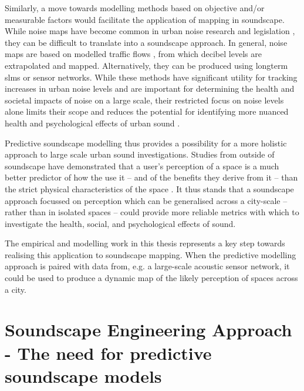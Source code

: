 Similarly, a move towards modelling methods based on objective and/or measurable factors would facilitate the application of mapping in soundscape. While noise maps have become common in urban noise research and legislation \citep{EEA2020Environment} , they can be difficult to translate into a soundscape approach. In general, noise maps are based on modelled traffic flows \cit{}, from which decibel levels are extrapolated and mapped. Alternatively, they can be produced using longterm \glspl{slm} or sensor networks. While these methods have significant utility for tracking increases in urban noise levels and are important for determining the health and societal impacts of noise on a large scale, their restricted focus on noise levels alone limits their scope and reduces the potential for identifying more nuanced health and psychological effects of urban sound .

Predictive soundscape modelling thus provides a possibility for a more holistic approach to large scale urban sound investigations. Studies from outside of soundscape have demonstrated that a user's perception of a space is a much better predictor of how the use it -- and of the benefits they derive from it -- than the strict physical characteristics of the space \citep{Kruize2019Exploring}. It thus stands that a soundscape approach focussed on perception which can be generalised across a city-scale -- rather than in isolated spaces -- could provide more reliable metrics with which to investigate the health, social, and psychological effects of sound.

The empirical and modelling work in this thesis represents a key step towards realising this application to soundscape mapping. When the predictive modelling approach is paired with data from, e.g. a large-scale acoustic sensor network, it could be used to produce a dynamic map of the likely perception of spaces across a city.



\section{Soundscape Engineering Approach - The need for predictive soundscape models}
\label{sec:NeedForPredModels}

